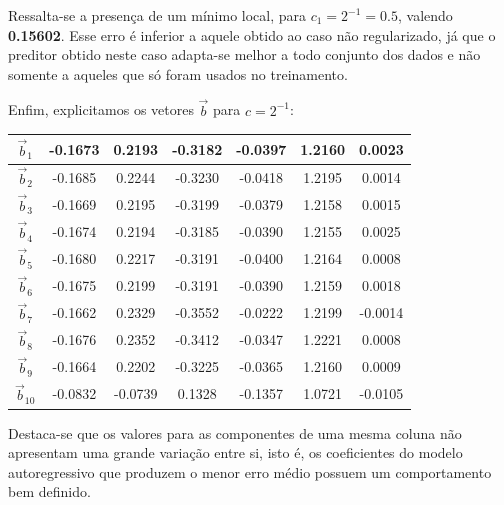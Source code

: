 	\FloatBarrier 
	
	Ressalta-se a presença de um mínimo local, para \(c_1 = 2^{-1} =
	0.5\), valendo \textbf{0.15602}. Esse erro é inferior a aquele obtido
	ao caso não regularizado, já que o preditor obtido
	neste caso adapta-se melhor a todo conjunto dos dados e não somente a aqueles
	que só foram usados no treinamento.
	
	\vspace{12pt}
	
	Enfim, explicitamos os vetores \(\overrightarrow{b}\) para \(c = 2^{-1}\):
	\FloatBarrier
	\begin {table}[H]
\centering
	\begin{tabular} {| c | c | c | c | c | c | c |}
	\hline 
	\( \overrightarrow{b}_1 \) & -0.1673 & 0.2193 & -0.3182 & -0.0397 & 1.2160 & 
	0.0023 \\\hline 
	\( \overrightarrow{b}_2 \) &-0.1685 & 0.2244 & -0.3230 & -0.0418 & 1.2195 &  0.0014
	\\ \hline 
	\( \overrightarrow{b}_3 \) & -0.1669 & 0.2195 & -0.3199 & -0.0379 & 1.2158 & 
	0.0015 \\ \hline 
	\( \overrightarrow{b}_4 \)  &-0.1674 & 0.2194 & -0.3185 & -0.0390 & 1.2155 & 
	0.0025 \\ \hline
	\( \overrightarrow{b}_5 \) & -0.1680 & 0.2217 & -0.3191 & -0.0400 & 1.2164 & 
	0.0008 \\ \hline 
	\( \overrightarrow{b}_6 \) & -0.1675 & 0.2199 & -0.3191 & -0.0390 & 1.2159 & 
	0.0018 \\ \hline 
	\( \overrightarrow{b}_7 \) & -0.1662 & 0.2329 & -0.3552 & -0.0222 & 1.2199 &
	-0.0014 \\ \hline 
	\( \overrightarrow{b}_8 \) & -0.1676 & 0.2352 & -0.3412 & -0.0347 & 1.2221 & 
	0.0008 \\ \hline 
	\( \overrightarrow{b}_9 \) &-0.1664 & 0.2202 & -0.3225 & -0.0365 & 1.2160 & 
	0.0009 \\ \hline 
	\( \overrightarrow{b}_{10} \) & -0.0832 & -0.0739 & 0.1328 & -0.1357 & 1.0721 &
	-0.0105 \\ \hline
	

	\end{tabular} 
\end {table}

Destaca-se que os valores para as componentes de uma mesma coluna não apresentam
uma grande variação entre si, isto é, os coeficientes do modelo autoregressivo
que produzem o menor erro médio possuem um comportamento bem definido.

